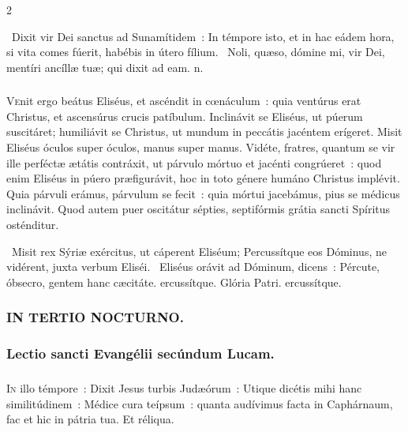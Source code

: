 \documentclass[9pt,twoside]{extarticle}
\begin{document}
\begin{multicols}{2}
{\begin{tightlist}{}
\item {}~Dixit vir Dei sanctus ad Sunamítidem~: \textred{*} In témpore isto, et in hac eádem hora, si vita comes fúerit, habébis in útero fílium. ~Noli, quæso, dómine mi, vir Dei, mentíri ancíllæ tuæ; qui dixit ad eam. n.
\end{tightlist}

\subsubsection*{\center {}}
\lettrine{V}enit ergo beátus Eliséus, et ascéndit in cœnáculum~: quia ventúrus erat Christus, et ascensúrus crucis patíbulum. Inclinávit se Eliséus, ut púerum suscitáret; humiliávit se Christus, ut mundum in peccátis jacéntem erígeret. Misit Eliséus óculos super óculos, manus super manus. Vidéte, fratres, quantum se vir ille perféctæ ætátis contráxit, ut párvulo mórtuo et jacénti congrúeret~: quod enim Eliséus in púero præfigurávit, hoc in toto génere humáno Christus implévit. Quia párvuli erámus, párvulum se fecit~: quia mórtui jacebámus, pius se médicus inclinávit. Quod autem puer oscitátur sépties, septifórmis grátia sancti Spíritus osténditur.

\begin{tightlist}{}
\item {}~Misit rex Sýriæ exércitus, ut cáperent Eliséum; \textred{*} Percussítque eos Dóminus, ne vidérent, juxta verbum Eliséi. ~Eliséus orávit ad Dóminum, dicens~: Pércute, óbsecro, gentem hanc cæcitáte. ercussítque. Glória Patri. ercussítque.
\end{tightlist}

\subsubsection*{\center \textsc{IN TERTIO NOCTURNO.}}
\subsubsection*{\center Lectio sancti Evangélii secúndum Lucam.}
\subsubsection*{\center {}}
\lettrine{I}n illo témpore~: Dixit Jesus turbis Judæórum~: Utique dicétis mihi hanc similitúdinem~: Médice cura teípsum~: quanta audívimus facta in Caphárnaum, fac et hic in pátria tua. Et réliqua.

}
\end{multicols}
\end{document}
